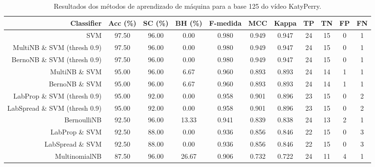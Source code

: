 \begin{table}[!htb]
\centering
\caption{Resultados dos métodos de aprendizado de máquina para a base 125 do vídeo KatyPerry.}
\label{tab:KatyPerry-125}
\begin{tabular}{r|c|c|c|c|c|c|c|c|c|c}
\hline\hline
Classifier & Acc (\%) & SC (\%) & BH (\%) & F-medida & MCC & Kappa & TP & TN & FP & FN \\ \hline
SVM & 97.50 & 96.00 & 0.00 & 0.980 & 0.949 & 0.947 & 24 & 15 & 0 & 1 \\ 
MultiNB \& SVM (thresh 0.9) & 97.50 & 96.00 & 0.00 & 0.980 & 0.949 & 0.947 & 24 & 15 & 0 & 1 \\ 
BernoNB \& SVM (thresh 0.9) & 97.50 & 96.00 & 0.00 & 0.980 & 0.949 & 0.947 & 24 & 15 & 0 & 1 \\ 
MultiNB \& SVM & 95.00 & 96.00 & 6.67 & 0.960 & 0.893 & 0.893 & 24 & 14 & 1 & 1 \\ 
BernoNB \& SVM & 95.00 & 96.00 & 6.67 & 0.960 & 0.893 & 0.893 & 24 & 14 & 1 & 1 \\ 
LabProp \& SVM (thresh 0.9) & 95.00 & 92.00 & 0.00 & 0.958 & 0.901 & 0.896 & 23 & 15 & 0 & 2 \\ 
LabSpread \& SVM (thresh 0.9) & 95.00 & 92.00 & 0.00 & 0.958 & 0.901 & 0.896 & 23 & 15 & 0 & 2 \\ 
BernoulliNB & 92.50 & 96.00 & 13.33 & 0.941 & 0.839 & 0.838 & 24 & 13 & 2 & 1 \\ 
LabProp \& SVM & 92.50 & 88.00 & 0.00 & 0.936 & 0.856 & 0.846 & 22 & 15 & 0 & 3 \\ 
LabSpread \& SVM & 92.50 & 88.00 & 0.00 & 0.936 & 0.856 & 0.846 & 22 & 15 & 0 & 3 \\ 
MultinomialNB & 87.50 & 96.00 & 26.67 & 0.906 & 0.732 & 0.722 & 24 & 11 & 4 & 1 \\ 
\hline\hline
\end{tabular}
\end{table}
